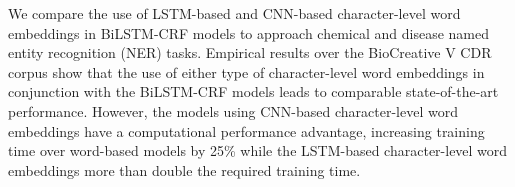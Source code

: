 We compare the use of LSTM-based and CNN-based character-level word embeddings in BiLSTM-CRF models to approach chemical and disease named entity recognition (NER) tasks.  Empirical results over the BioCreative V CDR corpus show that the use of either type of character-level word embeddings in conjunction with the BiLSTM-CRF models leads to comparable state-of-the-art performance. However, the models using CNN-based character-level word embeddings have a computational performance advantage, increasing training time over word-based models by 25\% while the LSTM-based  character-level word embeddings more than double the required training time.
